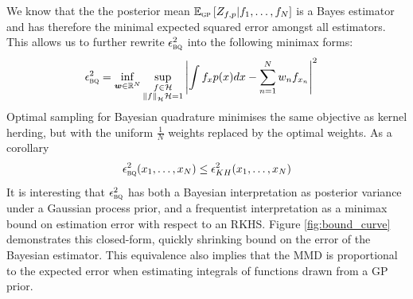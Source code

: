 \documentclass[]{article}
\begin{document}
We know that the the posterior mean $\mathbb{E}_{{\textsc{gp}}} \left[ {Z_{f,p}\vert f_1,\ldots,f_N} \right]$ is a Bayes estimator and has therefore the minimal expected squared error amongst all estimators. This allows us to further rewrite $\epsilon^{2}_{{\textsc{bq}}{}}$ into the following minimax forms:
%
\begin{align}
\epsilon^{2}_{\bq{}} %
	&= \inf_{\bm{w}\in\mathbb{R}^N} \sup_{\substack{f\in\He\\\Hnorm{f}{\He}=1}} \left| \int f_x p(x) dx - \sum_{n=1}^{N}w_n 	f_{x_n}\right|^2
\end{align}
%
Optimal sampling for Bayesian quadrature minimises the same objective as kernel herding, but with the uniform $\frac{1}{N}$ weights replaced by the optimal weights. As a corollary
%
\begin{align}
\epsilon^{2}_{{\textsc{bq}}{}}(x_1,\ldots,x_N)  \leq \epsilon^{2}_{KH} (x_1,\ldots,x_N)
\end{align}
%
It is interesting that $\epsilon^{2}_{{\textsc{bq}}{}}$ has both a Bayesian interpretation as posterior variance under a Gaussian process prior, and a frequentist interpretation as a minimax bound on estimation error with respect to an RKHS.  Figure \ref{fig:bound_curve} demonstrates this closed-form, quickly shrinking bound on the error of the Bayesian estimator.  This equivalence also implies that the MMD is proportional to the expected error when estimating integrals of functions drawn from a GP prior.
\end{document}
